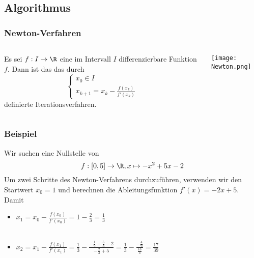 \subsection{Algorithmus}
%
\begin{frame}\frametitle{Newton-Verfahren}
\begin{columns}[T]
\begin{column}{0.5 \textwidth}
Es sei $f: I \to \R$ eine im Intervall $I$ differenzierbare Funktion $f$. Dann ist das  das durch
$$
\begin{cases}
x_0 \in I\\
x_{k+1}=x_{k}-\frac{f(x_k)}{f'(x_k)}
\end{cases}
$$
definierte Iterationsverfahren.
\end{column}
\begin{column}{0.5 \textwidth}
\texttt{[image: Newton.png]}
\end{column}
\end{columns}
\end{frame}
%
%
\begin{frame}\frametitle{Beispiel}
Wir suchen eine Nullstelle von
$$
f: [0,5]\to \R, x \mapsto -x^2+5x-2
$$\pause
Um zwei Schritte des Newton-Verfahrens durchzuführen, verwenden wir den Startwert $x_0=1$ und berechnen die Ableitungsfunktion $f'(x)=-2x+5$. \pause Damit
\vspace{10mm}
\Large
\begin{itemize}
\item $x_1=x_0-\frac{f(x_0)}{f'(x_0)}=1-\frac{2}{3}=\frac{1}{3}$\\\quad\\\pause
\item $x_2=x_1-\frac{f(x_1)}{f'(x_1)}=\frac{1}{3}-\frac{-\frac{1}{9}+\frac{5}{3}-2}{-\frac{2}{3}+5}=\frac{1}{3}-\frac{-\frac{4}{9}}{\frac{13}{3}}=\frac{17}{39}$
\end{itemize}
\end{frame}
%
%
